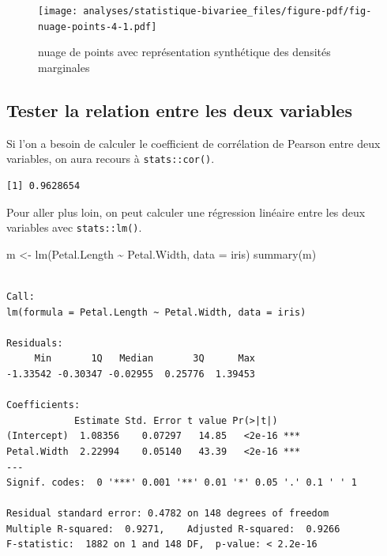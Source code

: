 \documentclass[
  letterpaper,
  DIV=11,
  numbers=noendperiod,
  oneside]{scrreprt}
\newenvironment{Shaded}{\begin{snugshade}}{\end{snugshade}}
\newcommand{\AttributeTok}[1]{\textcolor[rgb]{0.40,0.45,0.13}{#1}}
\newcommand{\FunctionTok}[1]{\textcolor[rgb]{0.28,0.35,0.67}{#1}}
\newcommand{\NormalTok}[1]{\textcolor[rgb]{0.00,0.23,0.31}{#1}}
\newcommand{\OtherTok}[1]{\textcolor[rgb]{0.00,0.23,0.31}{#1}}
\newcommand{\SpecialCharTok}[1]{\textcolor[rgb]{0.37,0.37,0.37}{#1}}
\begin{document}
\begin{figure}[H]

{\centering \texttt{[image: analyses/statistique-bivariee\_files/figure-pdf/fig-nuage-points-4-1.pdf]}

}

\caption{\label{fig-nuage-points-4}nuage de points avec représentation
synthétique des densités marginales}

\end{figure}

\hypertarget{tester-la-relation-entre-les-deux-variables}{%
\subsection{Tester la relation entre les deux
variables}\label{tester-la-relation-entre-les-deux-variables}}

Si l'on a besoin de calculer le coefficient de corrélation de Pearson
entre deux variables, on aura recours à \texttt{stats::cor()}.

\begin{Shaded}
\end{Shaded}

\begin{verbatim}
[1] 0.9628654
\end{verbatim}

Pour aller plus loin, on peut calculer une régression linéaire entre les
deux variables avec \texttt{stats::lm()}.

\begin{Shaded}
\begin{Highlighting}[]
\NormalTok{m }\OtherTok{\textless{}{-}} \FunctionTok{lm}\NormalTok{(Petal.Length }\SpecialCharTok{\textasciitilde{}}\NormalTok{ Petal.Width, }\AttributeTok{data =}\NormalTok{ iris)}
\FunctionTok{summary}\NormalTok{(m)}
\end{Highlighting}
\end{Shaded}

\begin{verbatim}

Call:
lm(formula = Petal.Length ~ Petal.Width, data = iris)

Residuals:
     Min       1Q   Median       3Q      Max 
-1.33542 -0.30347 -0.02955  0.25776  1.39453 

Coefficients:
            Estimate Std. Error t value Pr(>|t|)    
(Intercept)  1.08356    0.07297   14.85   <2e-16 ***
Petal.Width  2.22994    0.05140   43.39   <2e-16 ***
---
Signif. codes:  0 '***' 0.001 '**' 0.01 '*' 0.05 '.' 0.1 ' ' 1

Residual standard error: 0.4782 on 148 degrees of freedom
Multiple R-squared:  0.9271,    Adjusted R-squared:  0.9266 
F-statistic:  1882 on 1 and 148 DF,  p-value: < 2.2e-16
\end{verbatim}
\end{document}

